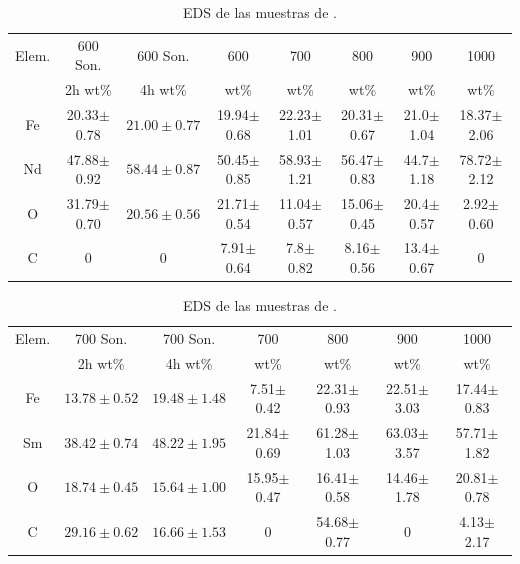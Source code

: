 \documentclass[../main.tex]{subfiles}
\begin{document}
\begin{table}[H]
    \begin{tabular}{|c||c|c|c|c|c|c|c|}
        \hline
        Elem. &600\gradoC{} Son.&600\gradoC{} Son.&600\gradoC{}&700\gradoC{}&800\gradoC{}&900\gradoC{}&1000\gradoC{}\\
        &2h wt\%&4h wt\%&wt\%&wt\%&wt\%&wt\%&wt\%\\
        \hline\hline
        Fe & 20.33$\pm$0.78 &$21.00\pm0.77$& 19.94$\pm$0.68 & 22.23$\pm$1.01 & 20.31$\pm$0.67 & 21.0$\pm$1.04 & 18.37$\pm$2.06 \\
        Nd & 47.88$\pm$0.92 &$58.44\pm0.87$& 50.45$\pm$0.85 & 58.93$\pm$1.21 & 56.47$\pm$0.83 & 44.7$\pm$1.18 & 78.72$\pm$2.12 \\
        O & 31.79$\pm$0.70 &$20.56\pm0.56$& 21.71$\pm$0.54 & 11.04$\pm$0.57 & 15.06$\pm$0.45 & 20.4$\pm$0.57 & 2.92$\pm$0.60 \\
        C & 0 & 0 & 7.91$\pm$0.64 & 7.8$\pm$0.82 & 8.16$\pm$0.56 & 13.4$\pm$0.67 &0 \\ 
        \hline
        \end{tabular} 
            \caption{EDS de las muestras de \neod{}.}
            \label{tab:EDSNd}
        \end{table}
        \begin{table}[H]
            \centering
        \begin{tabular}{|c||c|c|c|c|c|c|}
        \hline
        Elem. &700\gradoC{} Son.&700\gradoC{} Son.&700\gradoC{}&800\gradoC{}&900\gradoC{}&1000\gradoC{}\\
        &2h wt\%&4h wt\%&wt\%&wt\%&wt\%&wt\%\\
        \hline\hline
        Fe &$13.78\pm0.52$&$19.48\pm1.48$& 7.51$\pm$0.42 & 22.31$\pm$0.93 & 22.51$\pm$3.03 & 17.44$\pm$0.83 \\
        Sm &$38.42\pm0.74$&$48.22\pm1.95$& 21.84$\pm$0.69 & 61.28$\pm$1.03 & 63.03$\pm$3.57 & 57.71$\pm$1.82 \\
        O &$18.74\pm0.45$&$15.64\pm1.00$& 15.95$\pm$0.47 & 16.41$\pm$0.58 & 14.46$\pm$1.78 & 20.81$\pm$0.78 \\
        C &$29.16\pm0.62$&$16.66\pm1.53$& 0 & 54.68$\pm$0.77 & 0 & 4.13$\pm$2.17 \\ 
        \hline
        \end{tabular} 
            \caption{EDS de las muestras de \sama{}.}
            \label{tab:EDSSm}
\end{table}
\end{document}
